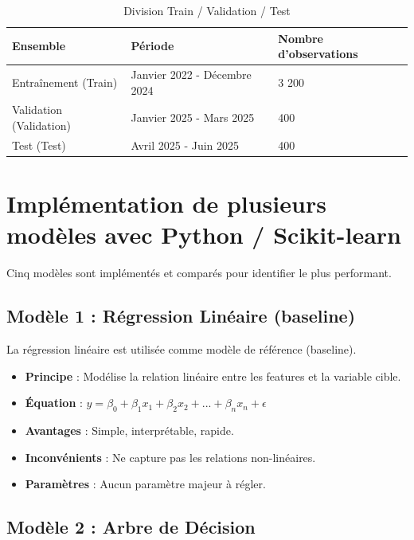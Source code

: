 \begin{table}[H]
\centering
\begin{tabular}{|p{5cm}|p{4cm}|p{4cm}|}
\hline
\textbf{Ensemble} & \textbf{Période} & \textbf{Nombre d'observations} \\
\hline
Entraînement (Train) & Janvier 2022 - Décembre 2024 & 3 200 \\
\hline
Validation (Validation) & Janvier 2025 - Mars 2025 & 400 \\
\hline
Test (Test) & Avril 2025 - Juin 2025 & 400 \\
\hline
\end{tabular}
\caption{Division Train / Validation / Test}
\label{tab:train-test-split}
\end{table}

\section{Implémentation de plusieurs modèles avec Python / Scikit-learn}
\label{sec:sprint5-models}

Cinq modèles sont implémentés et comparés pour identifier le plus performant.

\subsection{Modèle 1 : Régression Linéaire (baseline)}
\label{subsec:linear-regression}

La régression linéaire est utilisée comme modèle de référence (baseline).

\begin{itemize}
    \item \textbf{Principe} : Modélise la relation linéaire entre les features et la variable cible.
    \item \textbf{Équation} : \( y = \beta_0 + \beta_1 x_1 + \beta_2 x_2 + ... + \beta_n x_n + \epsilon \)
    \item \textbf{Avantages} : Simple, interprétable, rapide.
    \item \textbf{Inconvénients} : Ne capture pas les relations non-linéaires.
    \item \textbf{Paramètres} : Aucun paramètre majeur à régler.
\end{itemize}

\subsection{Modèle 2 : Arbre de Décision}
\label{subsec:decision-tree}

